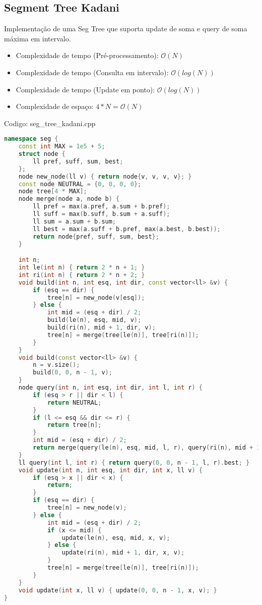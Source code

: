 \documentclass[10pt, a4paper, oneside]{book}
\begin{document}
\subsection{Segment Tree Kadani}


Implementação de uma Seg Tree que suporta update de soma e query de soma máxima em intervalo.



\begin{itemize}
\item Complexidade de tempo (Pré-processamento): $\mathcal{O}(N)$
\item Complexidade de tempo (Consulta em intervalo): $\mathcal{O}(log(N))$
\item Complexidade de tempo (Update em ponto): $\mathcal{O}(log(N))$
\item Complexidade de espaço: $4 * N = \mathcal{O}(N)$
\end{itemize}

\hfill

Codigo: seg\_tree\_kadani.cpp

\begin{lstlisting}[language=C++]
namespace seg {
    const int MAX = 1e5 + 5;
    struct node {
        ll pref, suff, sum, best;
    };
    node new_node(ll v) { return node{v, v, v, v}; }
    const node NEUTRAL = {0, 0, 0, 0};
    node tree[4 * MAX];
    node merge(node a, node b) {
        ll pref = max(a.pref, a.sum + b.pref);
        ll suff = max(b.suff, b.sum + a.suff);
        ll sum = a.sum + b.sum;
        ll best = max(a.suff + b.pref, max(a.best, b.best));
        return node{pref, suff, sum, best};
    }

    int n;
    int le(int n) { return 2 * n + 1; }
    int ri(int n) { return 2 * n + 2; }
    void build(int n, int esq, int dir, const vector<ll> &v) {
        if (esq == dir) {
            tree[n] = new_node(v[esq]);
        } else {
            int mid = (esq + dir) / 2;
            build(le(n), esq, mid, v);
            build(ri(n), mid + 1, dir, v);
            tree[n] = merge(tree[le(n)], tree[ri(n)]);
        }
    }
    void build(const vector<ll> &v) {
        n = v.size();
        build(0, 0, n - 1, v);
    }
    node query(int n, int esq, int dir, int l, int r) {
        if (esq > r || dir < l) {
            return NEUTRAL;
        }
        if (l <= esq && dir <= r) {
            return tree[n];
        }
        int mid = (esq + dir) / 2;
        return merge(query(le(n), esq, mid, l, r), query(ri(n), mid + 1, dir, l, r));
    }
    ll query(int l, int r) { return query(0, 0, n - 1, l, r).best; }
    void update(int n, int esq, int dir, int x, ll v) {
        if (esq > x || dir < x) {
            return;
        }
        if (esq == dir) {
            tree[n] = new_node(v);
        } else {
            int mid = (esq + dir) / 2;
            if (x <= mid) {
                update(le(n), esq, mid, x, v);
            } else {
                update(ri(n), mid + 1, dir, x, v);
            }
            tree[n] = merge(tree[le(n)], tree[ri(n)]);
        }
    }
    void update(int x, ll v) { update(0, 0, n - 1, x, v); }
}
\end{lstlisting}
\hfill
\end{document}

